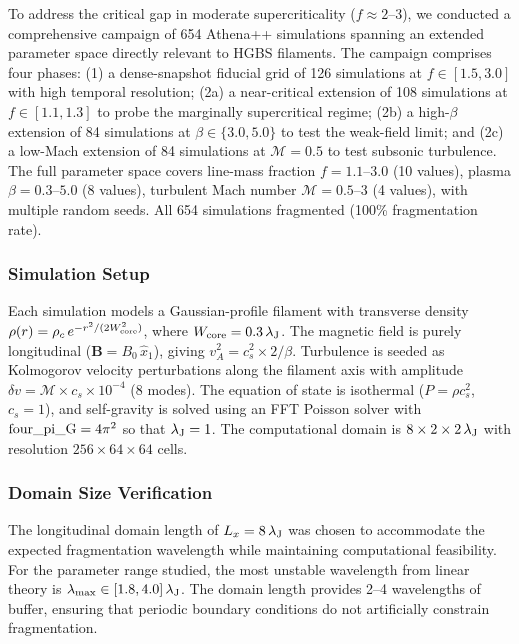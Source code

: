 \documentclass[twocolumn,longtitle,usenatbib]{mnras}
\begin{document}
To address the critical gap in moderate supercriticality ($f \approx 2$--$3$), we conducted a comprehensive campaign of 654 Athena++ simulations spanning an extended parameter space directly relevant to HGBS filaments. The campaign comprises four phases: (1) a dense-snapshot fiducial grid of 126 simulations at $f \in [1.5, 3.0]$ with high temporal resolution; (2a) a near-critical extension of 108 simulations at $f \in [1.1, 1.3]$ to probe the marginally supercritical regime; (2b) a high-$\beta$ extension of 84 simulations at $\beta \in \{3.0, 5.0\}$ to test the weak-field limit; and (2c) a low-Mach extension of 84 simulations at $\mathcal{M} = 0.5$ to test subsonic turbulence. The full parameter space covers line-mass fraction $f = 1.1$--$3.0$ (10 values), plasma $\beta = 0.3$--$5.0$ (8 values), turbulent Mach number $\mathcal{M} = 0.5$--$3$ (4 values), with multiple random seeds. All 654 simulations fragmented (100\% fragmentation rate).

\subsubsection{Simulation Setup}

Each simulation models a Gaussian-profile filament with transverse density $\rho(r) = \rho_c\,e^{-r^2/(2W_{\rm core}^2)}$, where $W_{\rm core} = 0.3\,\lambda_{\rm J}$. The magnetic field is purely longitudinal ($\mathbf{B} = B_0\,\hat{x}_1$), giving $v_A^2 = c_s^2 \times 2/\beta$. Turbulence is seeded as Kolmogorov velocity perturbations along the filament axis with amplitude $\delta v = \mathcal{M} \times c_s \times 10^{-4}$ (8 modes). The equation of state is isothermal ($P = \rho c_s^2$, $c_s = 1$), and self-gravity is solved using an FFT Poisson solver with ${\rm four\_pi\_G} = 4\pi^2$ so that $\lambda_{\rm J} = 1$. The computational domain is $8 \times 2 \times 2\,\lambda_{\rm J}$ with resolution $256 \times 64 \times 64$ cells.

\subsubsection{Domain Size Verification}

The longitudinal domain length of $L_x = 8\,\lambda_{\rm J}$ was chosen to accommodate the expected fragmentation wavelength while maintaining computational feasibility. For the parameter range studied, the most unstable wavelength from linear theory is $\lambda_{\rm max} \in [1.8, 4.0]\,\lambda_{\rm J}$. The domain length provides 2--4 wavelengths of buffer, ensuring that periodic boundary conditions do not artificially constrain fragmentation.
\end{document}
